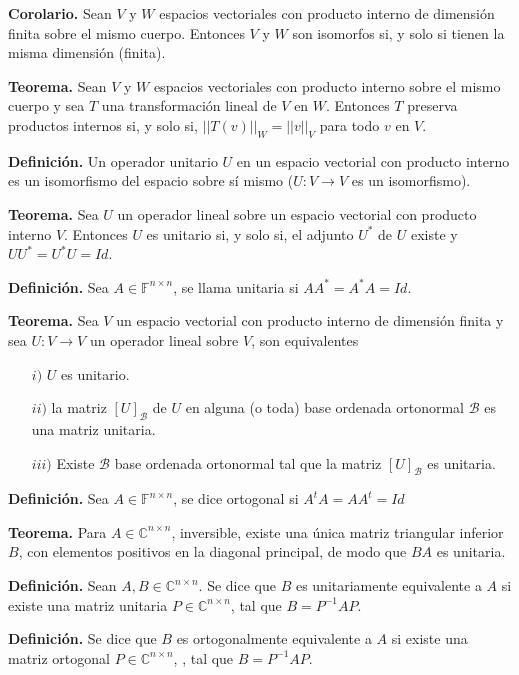 \newpage

\textbf{Corolario.} Sean $V$ y $W$ espacios vectoriales con
producto interno de dimensión finita sobre el mismo cuerpo.
Entonces $V$ y $W$ son isomorfos si, y solo si tienen la
misma dimensión (finita).

\textbf{Teorema.} Sean $V$ y $W$ espacios vectoriales con
producto interno sobre el mismo cuerpo y sea $T$ una
transformación lineal de $V$ en $W$. Entonces $T$ preserva
productos internos si, y solo si, $||T(v)||_{W}=||v||_{V}$
para todo $v$ en $V$.

\textbf{Definición.} Un operador unitario $U$ en un espacio
vectorial con producto interno es un isomorfismo del espacio
sobre sí mismo ($U : V \to V$ es un isomorfismo).

\textbf{Teorema.} Sea $U$ un operador lineal sobre un espacio
vectorial con producto interno $V$. Entonces $U$ es unitario
si, y solo si, el adjunto $U^{\ast}$ de $U$ existe y
$UU^{\ast} = U^{\ast}U = Id$.

\textbf{Definición.} Sea $A\in \mathbb{F}^{n\times n}$, se
llama unitaria si $AA^{\ast} = A^{\ast}A = Id$.

\textbf{Teorema.} Sea $V$ un espacio vectorial con producto
interno de dimensión finita y sea $U:V\to V$ un operador
lineal sobre $V$, son equivalentes
\begin{itemize}
    \item[$i)$] $U$ es unitario.
    \item[$ii)$] la matriz $[U]_{\mathcal{B}}$ de $U$ en
    alguna (o toda) base ordenada ortonormal $\mathcal{B}$
    es una matriz unitaria.
    \item[$iii)$] Existe $\mathcal{B}$ base ordenada ortonormal
    tal que la matriz $[U]_{\mathcal{B}}$ es unitaria.
\end{itemize}

\textbf{Definición.} Sea $A\in \mathbb{F}^{n\times n}$, se dice ortogonal si
$A^{t}A = AA^{t} = Id$

\textbf{Teorema.} Para $A\in \mathbb{C}^{n\times n}$, inversible,
existe una única matriz triangular inferior $B$, con elementos positivos
en la diagonal principal, de modo que $BA$ es unitaria.

\textbf{Definición.}  Sean $A, B\in \mathbb{C}^{n \times n}$.
Se dice que $B$ es unitariamente equivalente a $A$ si existe una matriz
unitaria $P\in \mathbb{C}^{n \times n}$, tal que $B = P^{-1}AP$.

\textbf{Definición.} Se dice que $B$ es ortogonalmente equivalente a $A$
si existe una matriz ortogonal $P\in \mathbb{C}^{n \times n}$, , tal que $B = P^{-1}AP$.